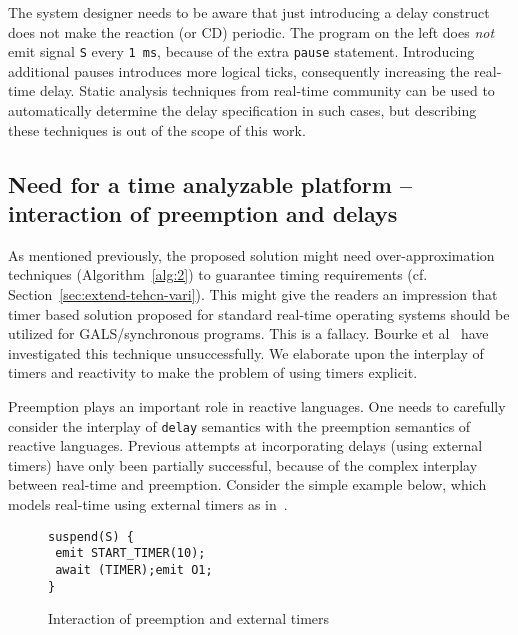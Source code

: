 The system designer needs to be aware that just introducing a delay
construct does not make the reaction (or CD) periodic. The program on
the left does \textit{not} emit signal \texttt{S} every \texttt{1 ms},
because of the extra \texttt{pause} statement. Introducing additional
pauses introduces more logical ticks, consequently increasing the
real-time delay. Static analysis techniques from real-time community can
be used to automatically determine the delay specification in such
cases, but describing these techniques is out of the scope of this work.

\subsection{Need for a time analyzable platform -- interaction of
  preemption and delays}
\label{sec:inter-preempt-delays}

As mentioned previously, the proposed solution might need
over-approximation techniques (Algorithm~\ref{alg:2}) to guarantee
timing requirements (cf. Section~\ref{sec:extend-tehcn-vari}). This
might give the readers an impression that timer based solution proposed
for standard real-time operating systems should be utilized for
GALS/synchronous programs. This is a fallacy. Bourke et
al~\cite{Bourke2009a} have investigated this technique
unsuccessfully. We elaborate upon the interplay of timers and reactivity
to make the problem of using timers explicit.

Preemption plays an important role in reactive languages. One needs to
carefully consider the interplay of \texttt{delay} semantics with the
preemption semantics of reactive languages. Previous attempts at
incorporating delays (using external timers) have only been partially
successful, because of the complex interplay between real-time and
preemption. Consider the simple example below, which models real-time
using external timers as in~\cite{rsh94}. 

\begin{figure}[h!]
  \centering
  \begin{minipage}[b]{\linewidth}
\begin{verbatim}
suspend(S) {
 emit START_TIMER(10); 
 await (TIMER);emit O1;
}
\end{verbatim}
  \end{minipage}
  \caption{Interaction of preemption and external timers}
  \label{fig:preemp}
\end{figure}

